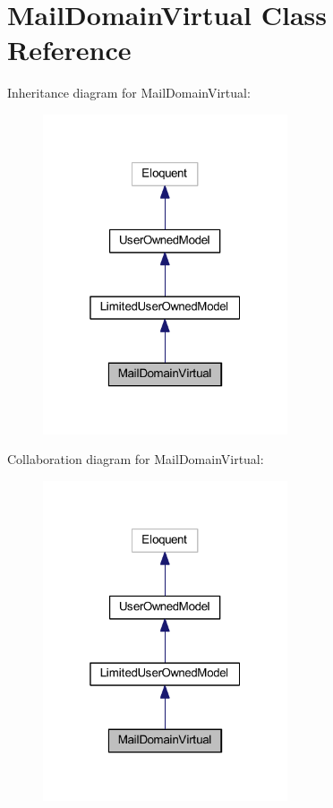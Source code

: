 \hypertarget{class_mail_domain_virtual}{}\section{Mail\+Domain\+Virtual Class Reference}
\label{class_mail_domain_virtual}


Inheritance diagram for Mail\+Domain\+Virtual\+:
\nopagebreak
\begin{figure}[H]
\begin{center}
\leavevmode
\includegraphics[width=205pt]{class_mail_domain_virtual__inherit__graph}
\end{center}
\end{figure}


Collaboration diagram for Mail\+Domain\+Virtual\+:
\nopagebreak
\begin{figure}[H]
\begin{center}
\leavevmode
\includegraphics[width=205pt]{class_mail_domain_virtual__coll__graph}
\end{center}
\end{figure}

